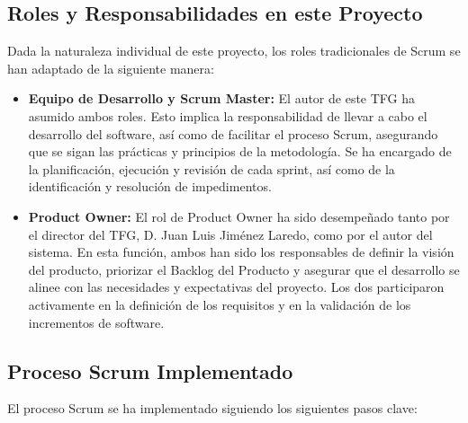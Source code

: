 \subsection{Roles y Responsabilidades en este Proyecto}

Dada la naturaleza individual de este proyecto, los roles tradicionales de Scrum se han adaptado de la siguiente manera:

\begin{itemize}
    \item \textbf{Equipo de Desarrollo y Scrum Master:} El autor de este TFG ha asumido ambos roles. Esto implica la responsabilidad de llevar a cabo el desarrollo del software, así como de facilitar el proceso Scrum, asegurando que se sigan las prácticas y principios de la metodología. Se ha encargado de la planificación, ejecución y revisión de cada sprint, así como de la identificación y resolución de impedimentos.
    \item \textbf{Product Owner:} El rol de Product Owner ha sido desempeñado tanto por el director del TFG, D. Juan Luis Jiménez Laredo, como por el autor del sistema. En esta función, ambos han sido los responsables de definir la visión del producto, priorizar el Backlog del Producto y asegurar que el desarrollo se alinee con las necesidades y expectativas del proyecto. Los dos participaron activamente en la definición de los requisitos y en la validación de los incrementos de software.
\end{itemize}

\subsection{Proceso Scrum Implementado}

El proceso Scrum se ha implementado siguiendo los siguientes pasos clave:

